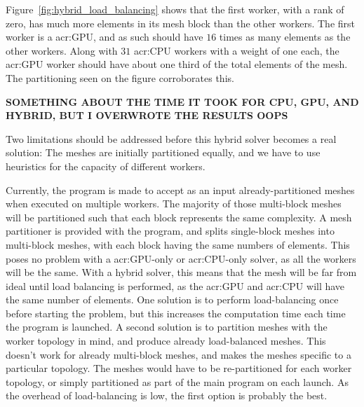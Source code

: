 Figure~\ref{fig:hybrid_load_balancing} shows that the first worker, with a rank of zero, has much
more elements in its mesh block than the other workers. The first worker is a \acrshort{acr:GPU},
and as such should have \(16\) times as many elements as the other workers. Along with \(31\)
\acrshort{acr:CPU} workers with a weight of one each, the \acrshort{acr:GPU} worker should have
about one third of the total elements of the mesh. The partitioning seen on the figure corroborates
this. 

\textcolor{vs_red}{\textbf{SOMETHING ABOUT THE TIME IT TOOK FOR CPU, GPU, AND HYBRID, BUT I OVERWROTE THE RESULTS OOPS}}

Two limitations should be addressed before this hybrid solver becomes a real solution: The meshes
are initially partitioned equally, and we have to use heuristics for the capacity of different
workers. 

Currently, the program is made to accept as an input already-partitioned meshes when executed on
multiple workers. The majority of those multi-block meshes will be partitioned such that each block
represents the same complexity. A mesh partitioner is provided with the program, and splits
single-block meshes into multi-block meshes, with each block having the same numbers of elements.
This poses no problem with a \acrshort{acr:GPU}-only or \acrshort{acr:CPU}-only solver, as all the
workers will be the same. With a hybrid solver, this means that the mesh will be far from ideal
until load balancing is performed, as the \acrshort{acr:GPU} and \acrshort{acr:CPU} will have the
same number of elements. One solution is to perform load-balancing once before starting the problem,
but this increases the computation time each time the program is launched. A second solution is to
partition meshes with the worker topology in mind, and produce already load-balanced meshes. This
doesn't work for already multi-block meshes, and makes the meshes specific to a particular topology.
The meshes would have to be re-partitioned for each worker topology, or simply partitioned as part
of the main program on each launch. As the overhead of load-balancing is low, the first option is
probably the best.

